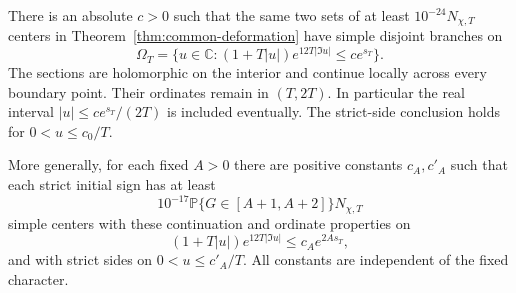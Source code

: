 \begin{theorem}\label{thm:anisotropic-continuation}
There is an absolute $c>0$ such that the same two sets of at least
$10^{-24}N_{\chi,T}$ centers in
Theorem~\ref{thm:common-deformation} have simple disjoint branches on
\[
 \Omega_T=\{u\in\mathbb C:
                 (1+T|u|)e^{12T|\Im u|}\le c e^{s_T}\}.
\]
The sections are holomorphic on the interior and continue locally
across every boundary point. Their ordinates remain in $(T,2T)$.
In particular the real interval $|u|\le c e^{s_T}/(2T)$ is included
eventually. The strict-side conclusion holds for $0<u\le c_0/T$.

More generally, for each fixed $A>0$ there are positive constants
$c_A,c'_A$ such that each strict initial sign has at least
\[
        10^{-17}\mathbb P\{G\in[A+1,A+2]\}N_{\chi,T}
\]
simple centers with these continuation and ordinate properties on
\[
                  (1+T|u|)e^{12T|\Im u|}\le c_A e^{2As_T},
\]
and with strict sides on $0<u\le c'_A/T$.
All constants are independent of the fixed character.
\end{theorem}

